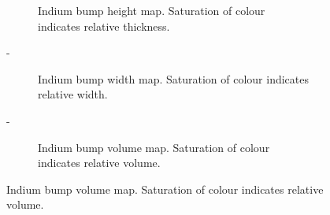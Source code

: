 \begin{figure}[h]
    \centering
\begin{subfigure}[t]{0.3\textwidth}
    \centering
    \tiny
    \caption{Indium bump height map. Saturation of colour indicates relative thickness.}
    \label{fig:bumpHeightMap}
\end{subfigure}
-
\begin{subfigure}[t]{0.3\textwidth}
    \centering
    \tiny
    \caption{Indium bump width map. Saturation of colour indicates relative width.}
    \label{fig:bumpWidthMap}
\end{subfigure}
-
\begin{subfigure}[t]{0.3\textwidth}
    \centering
    \tiny
    \caption{Indium bump volume map. Saturation of colour indicates relative volume.}
    \label{fig:bumpVolumeMap}
\end{subfigure}
\end{figure}


